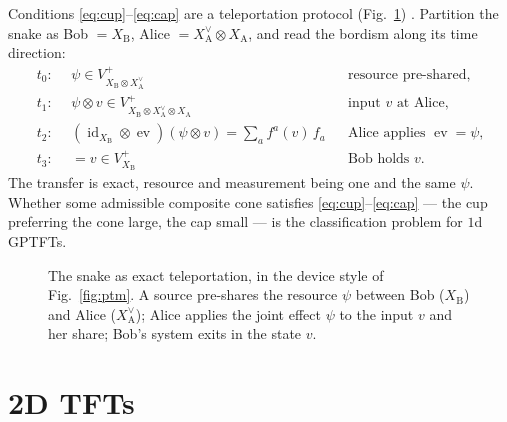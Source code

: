 \documentclass[prl,aps,10pt,superscriptaddress, floatfix]{revtex4-2}
\begin{document}
Conditions \eqref{eq:cup}--\eqref{eq:cap} are a teleportation protocol (Fig.~\ref{fig:teleport}) \cite{BBLW}. Partition the snake as Bob $=X_{\mathrm B}$, Alice $=X^\vee_{\mathrm A}\otimes X_{\mathrm A}$, and read the bordism along its time direction:
\begin{align*}
t_0:\ &\ \psi\in V^+_{X_{\mathrm B}\otimes X^\vee_{\mathrm A}} &&\text{resource pre-shared,}\\
t_1:\ &\ \psi\otimes v\in V^+_{X_{\mathrm B}\otimes X^\vee_{\mathrm A}\otimes X_{\mathrm A}} &&\text{input $v$ at Alice,}\\
t_2:\ &\ (\operatorname{id}_{X_{\mathrm B}}\!\otimes\operatorname{ev})(\psi\otimes v)=\textstyle\sum_af^a(v)\,f_a &&\text{Alice applies $\operatorname{ev}=\psi$,}\\
t_3:\ &\ =v\in V^+_{X_{\mathrm B}} &&\text{Bob holds $v$.}
\end{align*}
The transfer is exact, resource and measurement being one and the same $\psi$. Whether some admissible composite cone satisfies \eqref{eq:cup}--\eqref{eq:cap} --- the cup preferring the cone large, the cap small --- is the classification problem for $1$d GPTFTs.

\begin{figure}[t]
\centering
{}
\caption{The snake as exact teleportation, in the device style of Fig.~\ref{fig:ptm}. A source pre-shares the resource $\psi$ between Bob ($X_{\mathrm B}$) and Alice ($X^\vee_{\mathrm A}$); Alice applies the joint effect $\psi$ to the input $v$ and her share; Bob's system exits in the state $v$.}
\label{fig:teleport}
\end{figure}

\section{2D TFTs}
\end{document}
